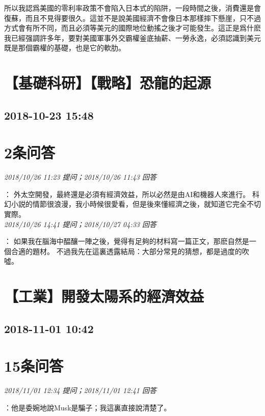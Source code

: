 \documentclass[twocolumn]{ctexart}
\begin{document}
所以我認爲美國的零利率政策不會陷入日本式的陷阱，一段時間之後，消費還是會復蘇，而且不見得要很久。這並不是說美國經濟不會像日本那樣摔下懸崖，只不過方式會有所不同，而且必須等美元的國際地位動搖之後才可能發生。這正是爲什麽我已經强調許多年，要對美國軍事外交霸權釜底抽薪、一勞永逸，必須認識到美元既是那個霸權的基礎，也是它的軟肋。
\\


\section{【基礎科研】【戰略】恐龍的起源}
\subsection{2018-10-23 15:48}


\section{2条问答}

\textit{\hfill\noindent\small 2018/10/26 11:23 提问；2018/10/26 11:43 回答}

：
外太空開發，最終還是必須有經濟效益，所以必然是由AI和機器人來進行。
科幻小説的情節很浪漫，我小時候很愛看，但是後來懂經濟之後，就知道它完全不切實際。
\\

\textit{\hfill\noindent\small 2018/10/26 14:41 提问；2018/10/27 04:33 回答}

：
如果我在腦海中醖釀一陣之後，覺得有足夠的材料寫一篇正文，那麽自然是一個合適的題材。
不過我先在這裏透露結局：大部分常見的猜想，都是過度的吹噓。
\\


\section{【工業】開發太陽系的經濟效益}
\subsection{2018-11-01 10:42}


\section{15条问答}

\textit{\hfill\noindent\small 2018/11/01 12:34 提问；2018/11/01 12:41 回答}

：他是委婉地說Musk是騙子；我這裏直接說清楚了。
\\
\end{document}
